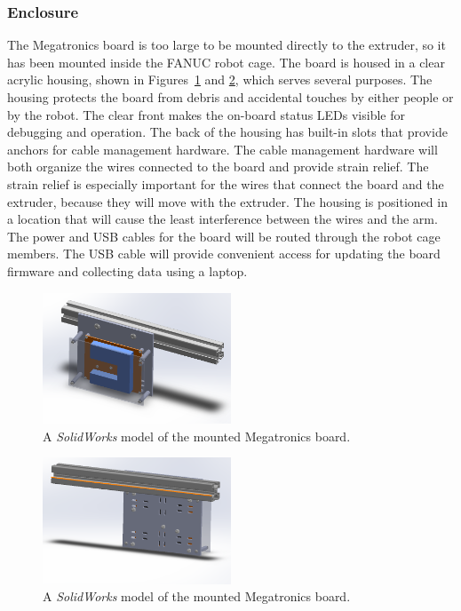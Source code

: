 \subsubsection{Enclosure}

\indent

The Megatronics board is too large to be mounted directly to the extruder, so it has been mounted inside the FANUC robot cage. The board is housed in a clear acrylic housing, shown in Figures~\ref{fig:megatronics-mount-back} and \ref{fig:megatronics-mount-front}, which serves several purposes. The housing protects the board from debris and accidental touches by either people or by the robot. The clear front makes the on-board status LEDs visible for debugging and operation. The back of the housing has built-in slots that provide anchors for cable management hardware. The cable management hardware will both organize the wires connected to the board and provide strain relief. The strain relief is especially important for the wires that connect the board and the extruder, because they will move with the extruder. The housing is positioned in a location that will cause the least interference between the wires and the arm. The power and USB cables for the board will be routed through the robot cage members. The USB cable will provide convenient access for updating the board firmware and collecting data using a laptop. 

\begin{figure}[htp]
\centering
\includegraphics[width=0.5\textwidth]{./figures/megatronics-mount-1}
\caption{A \emph{SolidWorks} model of the mounted Megatronics board.}
\label{fig:megatronics-mount-back}
\end{figure}

\begin{figure}[htp]
\centering
\includegraphics[width=0.5\textwidth]{./figures/megatronics-mount-2}
\caption{A \emph{SolidWorks} model of the mounted Megatronics board.}
\label{fig:megatronics-mount-front}
\end{figure}


